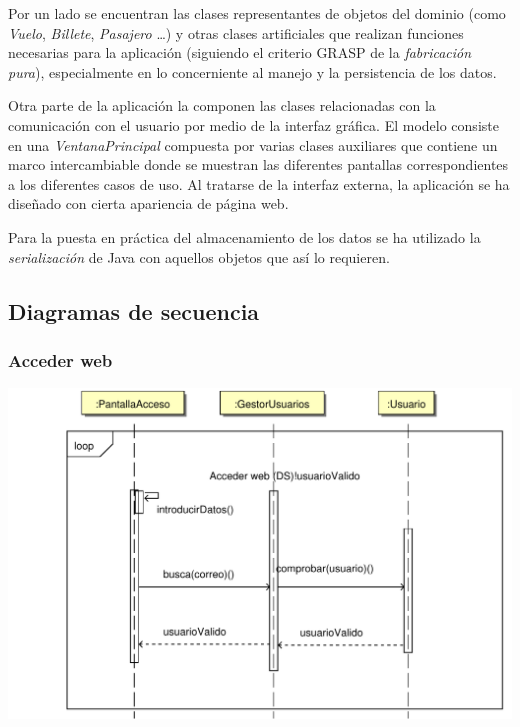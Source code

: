 \documentclass[11pt, a4paper, twoside, titlepage]{article}
\begin{document}
			Por un lado se encuentran las clases representantes de objetos del dominio (como \textit{Vuelo}, \textit{Billete}, \textit{Pasajero} \ldots) y otras clases artificiales que realizan funciones necesarias para la aplicación (siguiendo el criterio GRASP de la \textit{fabricación pura}), especialmente en lo concerniente al manejo y la persistencia de los datos.

			Otra parte de la aplicación la componen las clases relacionadas con la comunicación con el usuario por medio de la interfaz gráfica. El modelo consiste en una \textit{VentanaPrincipal} compuesta por varias clases auxiliares que contiene un marco intercambiable donde se muestran las diferentes pantallas correspondientes a los diferentes casos de uso. Al tratarse de la interfaz externa, la aplicación se ha diseñado con cierta apariencia de página web.

			Para la puesta en práctica del almacenamiento de los datos se ha utilizado la \textit{serialización} de Java con aquellos objetos que así lo requieren.

		\subsection{Diagramas de secuencia}
			\subsubsection{Acceder web}
				\begin{center}
					\includegraphics[scale=.7]{diseno/diagramas/accederweb.pdf}
				\end{center}
\end{document}
